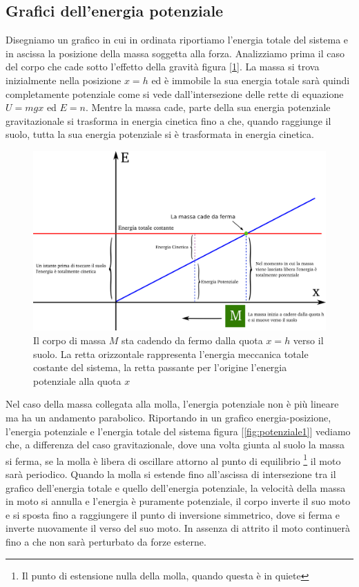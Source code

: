 \documentclass[a4paper,10pt,oneside]{article}
\begin{document}
\subsection*{Grafici dell'energia potenziale}

Disegniamo un grafico in cui in ordinata riportiamo l'energia totale del sistema e in ascissa la posizione della massa soggetta alla forza. Analizziamo prima il caso del corpo che cade sotto l'effetto della gravità figura [\ref{fig:potenziale2}]. La massa si trova inizialmente nella posizione $x=h$ ed è immobile la sua energia totale sarà quindi completamente potenziale come si vede dall'intersezione delle rette di equazione $U=mgx$ ed $E=n$. Mentre la massa cade, parte della sua energia potenziale gravitazionale si trasforma in energia cinetica fino a che, quando raggiunge il suolo, tutta la sua energia potenziale si è trasformata in energia cinetica.

\begin{figure}[H]
 \centering
 \includegraphics[width=\textwidth]{./immagini/pontenziale_gravitazionale.png}
 \caption{Il corpo di massa $M$ sta cadendo da fermo dalla quota $x=h$ verso il suolo. La retta orizzontale rappresenta l'energia meccanica totale costante del sistema, la retta passante per l'origine l'energia potenziale alla quota $x$}\label{fig:potenziale2}
\end{figure}

Nel caso della massa collegata alla molla, l'energia potenziale non è più lineare ma ha un andamento parabolico. Riportando in un grafico energia-posizione, l'energia potenziale e l'energia totale del sistema figura [\ref{fig:potenziale1}] vediamo che, a differenza del caso gravitazionale, dove una volta giunta al suolo la massa si ferma, se la molla è libera di oscillare attorno al punto di equilibrio \footnote{Il punto di estensione nulla  della molla, quando questa è in quiete} il moto sarà  periodico. Quando la molla si estende fino all'ascissa di intersezione tra il grafico dell'energia totale e quello dell'energia potenziale, la velocità della massa in moto si annulla e l'energia è puramente potenziale, il corpo inverte il suo moto e si sposta fino a raggiungere il punto di inversione simmetrico, dove si ferma e inverte nuovamente il verso del suo moto. In assenza di attrito il moto continuerà fino a che non sarà perturbato da forze esterne.
\end{document}
